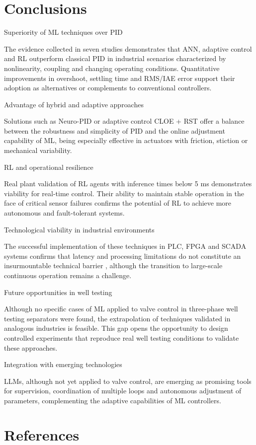 \documentclass{article}
\begin{document}
\section{Conclusions}

Superiority of ML techniques over PID

The evidence collected in seven studies demonstrates that ANN, adaptive control and RL outperform classical PID in industrial scenarios characterized by nonlinearity, 
coupling and changing operating conditions. Quantitative improvements in overshoot, settling time and RMS/IAE error support their adoption as alternatives 
or complements to conventional controllers.

Advantage of hybrid and adaptive approaches

Solutions such as Neuro-PID or adaptive control CLOE + RST offer a balance between the robustness and simplicity of PID and the online adjustment capability of ML, 
being especially effective in actuators with friction, stiction or mechanical variability.

RL and operational resilience

Real plant validation of RL agents with inference times below 5 ms demonstrates viability for real-time control. Their ability to maintain 
stable operation in the face of critical sensor failures confirms the potential of RL to achieve more autonomous and fault-tolerant systems.

Technological viability in industrial environments

The successful implementation of these techniques in PLC, FPGA and SCADA systems confirms that latency and processing limitations do not constitute an insurmountable technical barrier 
, although the transition to large-scale continuous operation remains a challenge.

Future opportunities in well testing

Although no specific cases of ML applied to valve control in three-phase well testing separators were found, the extrapolation of techniques validated in 
analogous industries is feasible. This gap opens the opportunity to design controlled experiments that reproduce real well testing conditions to validate these approaches.

Integration with emerging technologies

LLMs, although not yet applied to valve control, are emerging as promising tools for supervision, coordination of multiple loops and autonomous adjustment 
of parameters, complementing the adaptive capabilities of ML controllers.


\section{References}
\printbibliography
\end{document}
